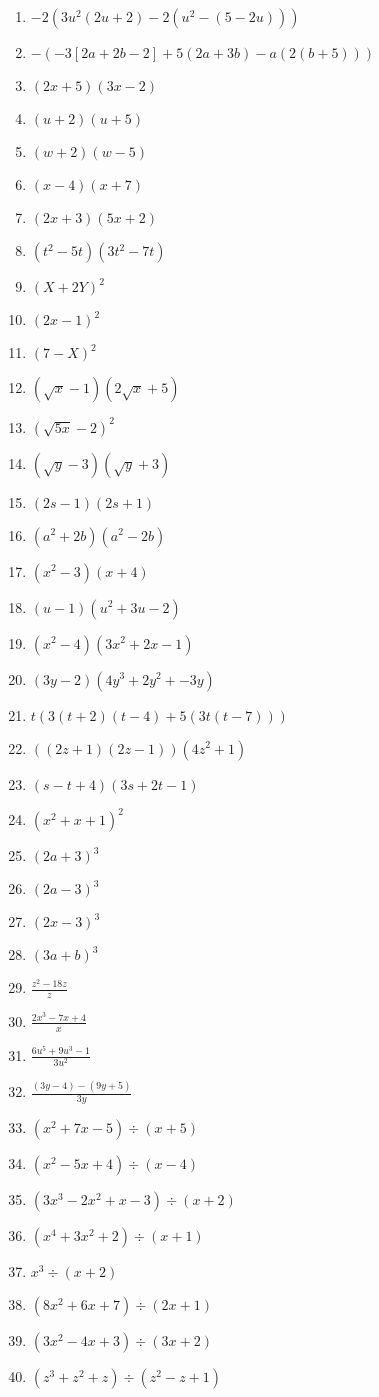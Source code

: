 \documentclass{article}
\begin{document}
\begin{onehalfspace}
\begin{enumerate}
    \item $-2(3u^{2}(2u + 2) - 2(u^{2} - (5 - 2u)))$
    \item $-(-3[2a + 2b - 2] + 5(2a + 3b) - a(2(b + 5)))$
    \item $(2x + 5)(3x - 2)$
    \item $(u + 2)(u + 5)$
    \item $(w + 2)(w - 5)$
    \item $(x - 4)(x + 7)$
    \item $(2x + 3)(5x + 2)$
    \item $(t^{2} - 5t)(3t^{2} - 7t)$
    \item $(X + 2Y)^{2}$
    \item $(2x - 1)^{2}$
    \item $(7 - X)^{2}$
    \item $(\sqrt{x} - 1)(2\sqrt{x} + 5)$
    \item $(\sqrt{5x} - 2)^{2}$
    \item $(\sqrt{y} - 3)(\sqrt{y} + 3)$
    \item $(2s - 1)(2s + 1)$
    \item $(a^{2} + 2b)(a^{2} - 2b)$
    \item $(x^{2} - 3)(x + 4)$
    \item $(u - 1)(u^{2} + 3u - 2)$
    \item $(x^{2} - 4)(3x^{2} + 2x - 1)$
    \item $(3y - 2)(4y^{3} + 2y^{2} + -3y)$
    \item $t(3(t + 2)(t - 4) + 5(3t(t - 7)))$
    \item $((2z + 1)(2z - 1))(4z^{2} + 1)$
    \item $(s - t + 4)(3s + 2t - 1)$
    \item $(x^{2} + x + 1)^{2}$
    \item $(2a + 3)^{3}$
    \item $(2a - 3)^{3}$
    \item $(2x - 3)^{3}$
    \item $(3a + b)^{3}$
    \item $\frac{z^{2} - 18z}{z}$
    \item $\frac{2x^{3} - 7x + 4}{x}$
    \item $\frac{6u^{5} + 9u^{3} - 1}{3u^{2}}$
    \item $\frac{(3y - 4) - (9y + 5)}{3y}$
    \item $(x^{2} + 7x - 5) \div (x + 5)$
    \item $(x^{2} - 5x + 4) \div (x - 4)$
    \item $(3x^{3} - 2x^{2} + x - 3) \div (x + 2)$
    \item $(x^{4} + 3x^{2} + 2) \div (x + 1)$
    \item $x^{3} \div (x + 2)$
    \item $(8x^{2} + 6x + 7) \div (2x + 1)$
    \item $(3x^{2} - 4x + 3) \div (3x + 2)$
    \item $(z^{3}+ z^{2} + z) \div (z^{2} - z + 1)$
\end{enumerate}
\end{onehalfspace}
\end{document}

